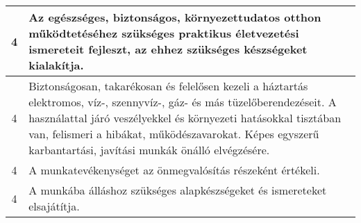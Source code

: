 \begin{longtable}{c | p{12cm} }
                                
                                          4 &  Az egészséges, biztonságos, környezettudatos otthon működtetéséhez szükséges praktikus életvezetési ismereteit fejleszt, az ehhez szükséges készségeket kialakítja. \\ \hline
                                          4 &  Biztonságosan, takarékosan és felelősen kezeli a háztartás elektromos, víz-, szennyvíz-, gáz- és más tüzelőberendezéseit. A használattal járó veszélyekkel és környezeti hatásokkal tisztában van, felismeri a hibákat, működészavarokat. Képes egyszerű karbantartási, javítási munkák önálló elvégzésére. \\ \hline
                                          4 &  A munkatevékenységet az önmegvalósítás részeként értékeli. \\ \hline
                                          4 &  A munkába álláshoz szükséges alapkészségeket és ismereteket elsajátítja. \\ \hline
                                      
                        \end{longtable}
            \clearpage

